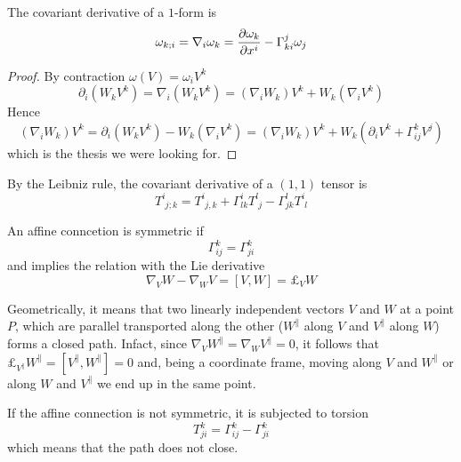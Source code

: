     The covariant derivative of a $1$-form is 
    \begin{equation*}
        \omega_{k;i} = \nabla_i \omega_k = \frac{\partial\omega_k}{\partial x^i} - \Gamma^j_{ki} \omega_j
    \end{equation*}

    \begin{proof}
        By contraction $\omega (V) = \omega_i V^k$
        \begin{equation*}
            \partial_i (W_k V^k) = \nabla_i (W_k V^k) = (\nabla_i W_k) V^k + W_k (\nabla_i V^k)
        \end{equation*}
        Hence 
        \begin{equation*}
            (\nabla_i W_k) V^k = \partial_i (W_k V^k) - W_k (\nabla_i V^k) = (\nabla_i W_k) V^k + W_k (\partial_i V^k + \Gamma^k_{ij} V^j)
        \end{equation*}
        which is the thesis we were looking for.
    \end{proof}

    By the Leibniz rule, the covariant derivative of a $(1,1)$ tensor is 
    \begin{equation*}
        T^i_{\phantom i j;k} = T^i_{\phantom i j,k} + \Gamma^i_{lk} T^l_{\phantom l j} - \Gamma^l_{jk} T^i_{\phantom i l}
    \end{equation*}

    An affine conncetion is symmetric if 
    \begin{equation*}
        \Gamma^k_{ij} = \Gamma^k_{ji} 
    \end{equation*}
    and implies the relation with the Lie derivative
    \begin{equation*}
        \nabla_V W - \nabla_W V = [V, W] = \pounds_V W
    \end{equation*}

    Geometrically, it means that two linearly independent vectors $V$ and $W$ at a point $P$, which are parallel transported along the other ($W^\parallel$ along $V$ and $V^\parallel$ along $W$) forms a closed path. Infact, since $\nabla_V W^\parallel = \nabla_W V^\parallel = 0$, it follows that $\pounds_{V^\parallel} W^\parallel = [V^\parallel, W^\parallel] = 0$ and, being a coordinate frame, moving along $V$ and $W^\parallel$ or along $W$ and $V^\parallel$ we end up in the same point. 

    If the affine connection is not symmetric, it is subjected to torsion 
    \begin{equation*}
        T^k_{ji} = \Gamma^k_{ij} - \Gamma^k_{ji}
    \end{equation*}
    which means that the path does not close. 

